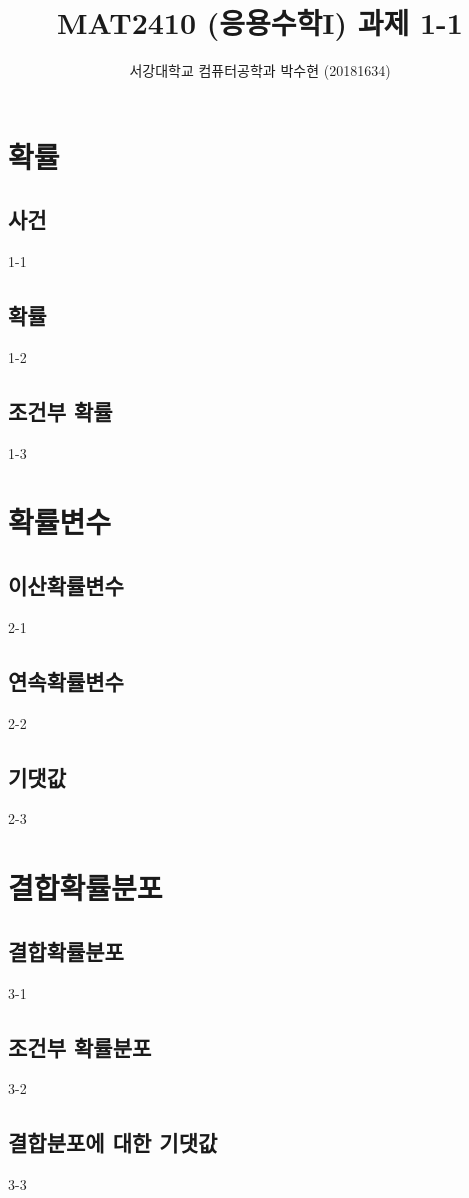



\title{MAT2410 (응용수학I) \space \newline 과제 1-1}
\author{서강대학교 컴퓨터공학과 박수현 (20181634)}
\maketitle

\setcounter{section}{0}

\section{확률}
\setcounter{subsection}{0}

\subsection{사건}
{1-1}

\newpage
\subsection{확률}
{1-2}

\newpage
\subsection{조건부 확률}
{1-3}

\newpage
\section{확률변수}
\setcounter{subsection}{0}

\subsection{이산확률변수}
{2-1}

\newpage
\subsection{연속확률변수}
{2-2}

\newpage
\subsection{기댓값}
{2-3}

\newpage
\section{결합확률분포}
\setcounter{subsection}{0}

\subsection{결합확률분포}
{3-1}

\newpage
\subsection{조건부 확률분포}
{3-2}

\newpage
\subsection{결합분포에 대한 기댓값}
{3-3}


